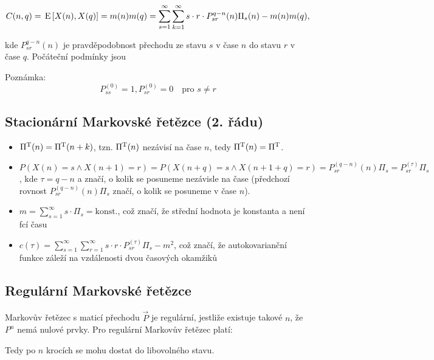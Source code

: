 \[ C(n,q)=\,\mathrm{E}\left[X(n),X(q)\right]=m(n)m(q)=\sum_{s=1}^\infty\sum_{k=1}^\infty s\cdot r\cdot P_{sr}^{q-n}(n)\Pi_s(n)-m(n)m(q), \]

kde $P_{sr}^{q-n}(n)$ je pravděpodobnost přechodu ze stavu $s$ v čase $n$ do stavu $r$ v čase $q$. Počáteční podmínky jsou

Poznámka:
\[ P_{ss}^{(0)}=1, P_{sr}^{(0)}=0\quad\text{pro } s\neq r \]

\subsection{Stacionární Markovské řetězce (2. řádu)}

\begin{itemize}
\item $\Pi^{\mathrm{T}}(n)=\Pi^{\mathrm{T}}(n+k)$, tzn. $\Pi^{\mathrm{T}}(n)$ nezávisí na čase $n$, tedy $\Pi^{\mathrm{T}}(n)=\Pi^{\mathrm{T}}$.
\item $P(X(n)=s \wedge X(n+1)=r)=P(X(n+q)=s \wedge X(n+1+q)=r)=P_{sr}^{(q-n)}(n)\Pi_s=P_{sr}^{(\tau)}\Pi_s$, kde $\tau = q-n$ a značí, o kolik se posuneme nezávisle na čase (předchozí rovnost $P_{sr}^{(q-n)}(n)\Pi_s$ značí, o kolik se posuneme v čase $n$).
\item $m=\displaystyle\sum_{s=1}^\infty s\cdot\Pi_s=\text{konst.}$, což značí, že střední hodnota je konstanta a není fcí času
\item $c(\tau)=\sum_{s=1}^\infty\sum_{r=1}^\infty s\cdot r\cdot P_{sr}^{(\tau)}\Pi_s-m^2$, což značí, že autokovarianční funkce záleží na vzdálenosti dvou časových okamžiků
\end{itemize}

\subsection{Regulární Markovské řetězce}
Markovův řetězec s maticí přechodu $\vec{P}$ je regulární, jestliže existuje takové $n$, že $P^n$ nemá nulové prvky. Pro regulární Markovův řetězec platí:

Tedy po $n$ krocích se mohu dostat do libovolného stavu.

